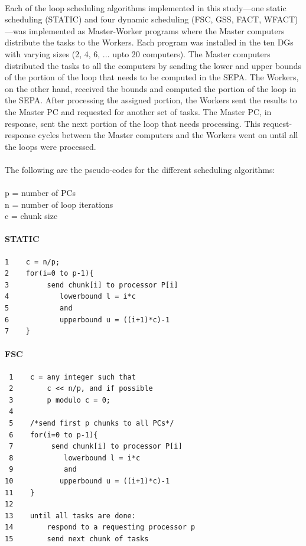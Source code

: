 \documentclass[10pt, twocolumn, letterpaper]{article}
\begin{document}
\paragraph{}
Each of the loop scheduling algorithms implemented in this study---one static scheduling (\textsf{STATIC}) and four dynamic scheduling (\textsf{FSC}, \textsf{GSS}, \textsf{FACT}, \textsf{WFACT})---was implemented as Master-Worker programs where the Master computers distribute the tasks to the Workers. Each program was installed in the ten DGs with varying sizes (2, 4, 6, ... upto 20 computers). The Master computers distributed the tasks to all the computers by sending the lower and upper bounds of the portion of the loop that needs to be computed in the SEPA. The Workers, on the other hand, received the bounds and computed the portion of the loop in the SEPA. After processing the assigned portion, the Workers sent the results to the Master PC and requested for another set of tasks. The Master PC, in response, sent the next portion of the loop that needs processing. This request-response cycles between the Master computers and the Workers went on until all the loops were processed.

\paragraph{}
The following are the pseudo-codes for the different scheduling algorithms:\\\\
p\textsf{ = number of PCs}\\
n\textsf{ = number of loop iterations}\\
c\textsf{ = chunk size}

\paragraph{\textsf{STATIC}}
\begin{verbatim}
1    c = n/p;
2    for(i=0 to p-1){
3         send chunk[i] to processor P[i]
4            lowerbound l = i*c
5            and
6            upperbound u = ((i+1)*c)-1
7    }
\end{verbatim}

\paragraph{\textsf{FSC}}
\begin{verbatim}
 1    c = any integer such that
 2        c << n/p, and if possible
 3        p modulo c = 0;
 4
 5    /*send first p chunks to all PCs*/
 6    for(i=0 to p-1){
 7         send chunk[i] to processor P[i]
 8            lowerbound l = i*c
 9            and
10           upperbound u = ((i+1)*c)-1
11    }
12
13    until all tasks are done:
14        respond to a requesting processor p
15        send next chunk of tasks
\end{verbatim}
\end{document}
